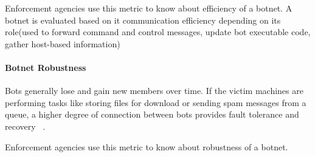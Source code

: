 Enforcement agencies use this metric to know about efficiency of a botnet. A botnet is evaluated based on it communication efficiency depending on its role(used to forward command and control messages, update bot executable code, gather host-based information)

\paragraph{ Botnet Robustness }

Bots generally lose and gain new members over time. If the victim machines are performing  tasks like storing files for download or sending spam messages from a queue, a higher degree of connection  between bots provides fault tolerance and  recovery ~\cite{Strayer08botnetdetection}.

Enforcement agencies use this metric to know about robustness of a botnet.